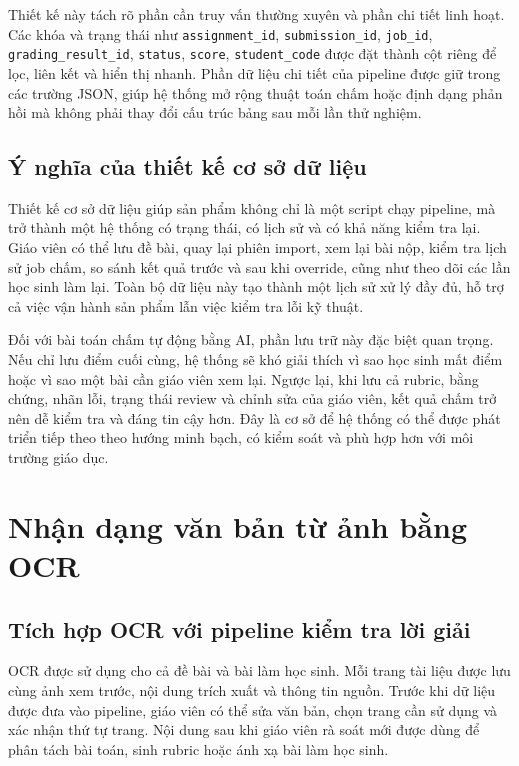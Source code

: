 \documentclass[12pt,a4paper]{article}
\begin{document}
Thiết kế này tách rõ phần cần truy vấn thường xuyên và phần chi tiết linh hoạt.
Các khóa và trạng thái như \texttt{assignment\_id}, \texttt{submission\_id},
\texttt{job\_id}, \texttt{grading\_result\_id}, \texttt{status},
\texttt{score}, \texttt{student\_code} được đặt thành cột riêng để lọc, liên kết
và hiển thị nhanh. Phần dữ liệu chi tiết của pipeline được giữ trong các trường
JSON, giúp hệ thống mở rộng thuật toán chấm hoặc định dạng phản hồi mà không
phải thay đổi cấu trúc bảng sau mỗi lần thử nghiệm.

\subsection{Ý nghĩa của thiết kế cơ sở dữ liệu}

Thiết kế cơ sở dữ liệu giúp sản phẩm không chỉ là một script chạy pipeline, mà
trở thành một hệ thống có trạng thái, có lịch sử và có khả năng kiểm tra lại.
Giáo viên có thể lưu đề bài, quay lại phiên import, xem lại bài nộp, kiểm tra
lịch sử job chấm, so sánh kết quả trước và sau khi override, cũng như theo dõi
các lần học sinh làm lại. Toàn bộ dữ liệu này tạo thành một lịch sử xử lý đầy
đủ, hỗ trợ cả việc vận hành sản phẩm lẫn việc kiểm tra lỗi kỹ thuật.

Đối với bài toán chấm tự động bằng AI, phần lưu trữ này đặc biệt quan trọng. Nếu
chỉ lưu điểm cuối cùng, hệ thống sẽ khó giải thích vì sao học sinh mất điểm hoặc
vì sao một bài cần giáo viên xem lại. Ngược lại, khi lưu cả rubric, bằng chứng,
nhãn lỗi, trạng thái review và chỉnh sửa của giáo viên, kết quả chấm trở nên dễ
kiểm tra và đáng tin cậy hơn. Đây là cơ sở để hệ thống có thể được phát triển
tiếp theo theo hướng minh bạch, có kiểm soát và phù hợp hơn với môi trường giáo
dục.


\section{Nhận dạng văn bản từ ảnh bằng OCR}



\subsection{Tích hợp OCR với pipeline kiểm tra lời giải}



OCR được sử dụng cho cả đề bài và bài làm học sinh. Mỗi trang tài liệu được lưu
cùng ảnh xem trước, nội dung trích xuất và thông tin nguồn. Trước khi dữ liệu được
đưa vào pipeline, giáo viên có thể sửa văn bản, chọn trang cần sử dụng và xác nhận
thứ tự trang. Nội dung sau khi giáo viên rà soát mới được dùng để phân tách bài toán,
sinh rubric hoặc ánh xạ bài làm học sinh.
\end{document}
